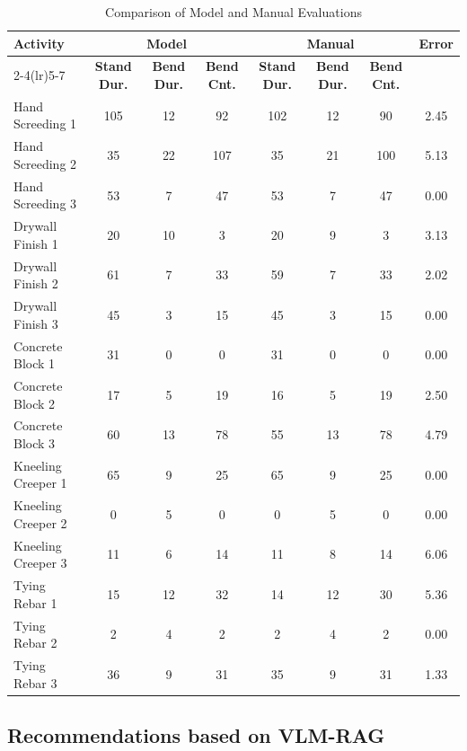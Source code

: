\documentclass[11pt]{article}
\begin{document}



\begin{table}[H]
\centering
\scriptsize
\caption{Comparison of Model and Manual Evaluations}
\setlength{\tabcolsep}{4pt} %
\renewcommand{\arraystretch}{0.95} %
\begin{tabular}{lccc ccc c}
\toprule
\multirow{2}{*}{\textbf{Activity}} 
& \multicolumn{3}{c}{\textbf{Model}} 
& \multicolumn{3}{c}{\textbf{Manual}} 
& \multirow{2}{*}{\textbf{Error}} \\
\cmidrule(lr){2-4}\cmidrule(lr){5-7}
& \textbf{\scriptsize Stand Dur.} & \textbf{\scriptsize Bend Dur.} & \textbf{\scriptsize Bend Cnt.} 
& \textbf{\scriptsize Stand Dur.} & \textbf{\scriptsize Bend Dur.} & \textbf{\scriptsize Bend Cnt.} 
& \\
\midrule
Hand Screeding 1 & 105 & 12 & 92 & 102 & 12 & 90 & 2.45 \\
Hand Screeding 2 & 35 & 22 & 107 & 35 & 21 & 100 & 5.13 \\
Hand Screeding 3 & 53 & 7 & 47 & 53 & 7 & 47 & 0.00 \\
Drywall Finish 1 & 20 & 10 & 3 & 20 & 9 & 3 & 3.13 \\
Drywall Finish 2 & 61 & 7 & 33 & 59 & 7 & 33 & 2.02 \\
Drywall Finish 3 & 45 & 3 & 15 & 45 & 3 & 15 & 0.00 \\
Concrete Block 1 & 31 & 0 & 0 & 31 & 0 & 0 & 0.00 \\
Concrete Block 2 & 17 & 5 & 19 & 16 & 5 & 19 & 2.50 \\
Concrete Block 3 & 60 & 13 & 78 & 55 & 13 & 78 & 4.79 \\
Kneeling Creeper 1 & 65 & 9 & 25 & 65 & 9 & 25 & 0.00 \\
Kneeling Creeper 2 & 0 & 5 & 0 & 0 & 5 & 0 & 0.00 \\
Kneeling Creeper 3 & 11 & 6 & 14 & 11 & 8 & 14 & 6.06 \\
Tying Rebar 1 & 15 & 12 & 32 & 14 & 12 & 30 & 5.36 \\
Tying Rebar 2 & 2 & 4 & 2 & 2 & 4 & 2 & 0.00 \\
Tying Rebar 3 & 36 & 9 & 31 & 35 & 9 & 31 & 1.33 \\
\bottomrule
\end{tabular}
\label{table1}
\end{table}




\subsection{Recommendations based on VLM-RAG}
\end{document}

